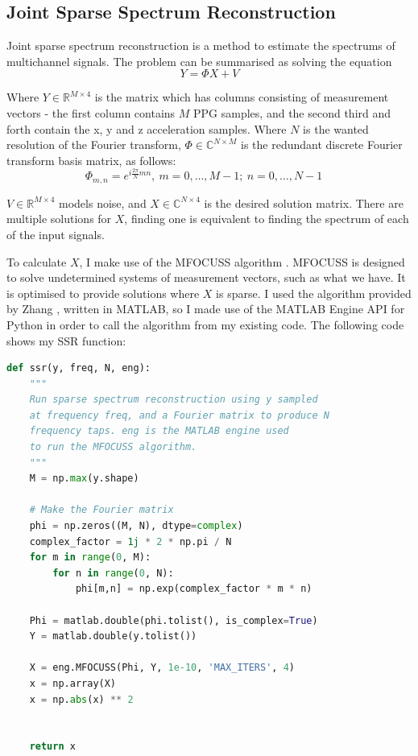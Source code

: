 \documentclass[12pt,a4paper,twoside,openany]{report}
\begin{document}
\subsection{Joint Sparse Spectrum Reconstruction}

Joint sparse spectrum reconstruction is a method to estimate the spectrums of
multichannel signals. The problem can be summarised as solving the equation 
$$ Y = \Phi X + V $$

Where $Y \in \mathbb{R}^{M \times 4}$ is the matrix which has columns consisting of measurement vectors -
the first column contains $M$ PPG samples, and the second third and forth contain
the x, y and z acceleration samples. Where $N$ is the wanted resolution of
the Fourier transform, $\Phi \in \mathbb{C}^{N \times M}$ is the redundant discrete Fourier
transform basis matrix, as follows:
$$ \Phi_{m,n} = e^{i \frac{2 \pi}{N}mn},\ m = 0,\ldots,M-1;\ n=0,\ldots,N-1
\quad $$

$V \in \mathbb{R} ^{M \times 4}$ models noise, and $X \in
\mathbb{C}^{N \times 4}$ is the desired solution matrix. There are multiple
solutions for $X$, finding one is equivalent to finding the spectrum of each
of the input signals.

To calculate $X$, I make use of the MFOCUSS algorithm \cite{Cotter05}.
MFOCUSS is designed to solve undetermined systems of measurement vectors, such
as what we have. It is optimised to provide solutions where $X$ is sparse.
I used the
algorithm provided by Zhang \cite{ZhangCodes}, written in MATLAB, so I made use of the MATLAB
Engine API for Python in order to call the algorithm from my existing code. The 
following code shows my SSR function:

\begin{lstlisting}[language=Python]
def ssr(y, freq, N, eng):
    """
    Run sparse spectrum reconstruction using y sampled 
    at frequency freq, and a Fourier matrix to produce N 
    frequency taps. eng is the MATLAB engine used
    to run the MFOCUSS algorithm.
    """
    M = np.max(y.shape)

    # Make the Fourier matrix
    phi = np.zeros((M, N), dtype=complex)
    complex_factor = 1j * 2 * np.pi / N 
    for m in range(0, M): 
        for n in range(0, N): 
            phi[m,n] = np.exp(complex_factor * m * n)

    Phi = matlab.double(phi.tolist(), is_complex=True)
    Y = matlab.double(y.tolist())

    X = eng.MFOCUSS(Phi, Y, 1e-10, 'MAX_ITERS', 4)
    x = np.array(X)
    x = np.abs(x) ** 2


    return x
\end{lstlisting}
\end{document}
